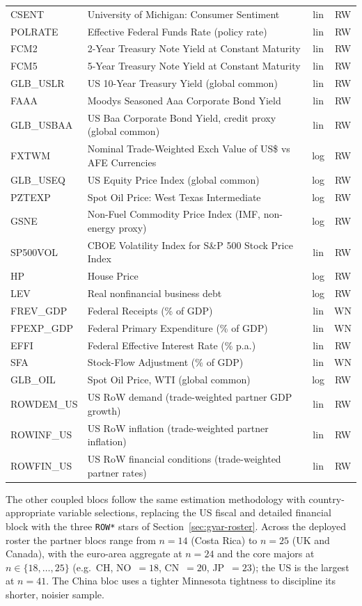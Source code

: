\documentclass[11pt]{article}
\theoremstyle{definition}
\theoremstyle{remark}
\begin{document}
\begin{longtable}{lp{6.5cm}cc}
CSENT     & University of Michigan: Consumer Sentiment & lin & RW \\
POLRATE   & Effective Federal Funds Rate (policy rate) & lin & RW \\
FCM2      & 2-Year Treasury Note Yield at Constant Maturity & lin & RW \\
FCM5      & 5-Year Treasury Note Yield at Constant Maturity & lin & RW \\
GLB\_USLR & US 10-Year Treasury Yield (global common) & lin & RW \\
FAAA      & Moodys Seasoned Aaa Corporate Bond Yield & lin & RW \\
GLB\_USBAA& US Baa Corporate Bond Yield, credit proxy (global common) & lin & RW \\
FXTWM     & Nominal Trade-Weighted Exch Value of US\$ vs AFE Currencies & log & RW \\
GLB\_USEQ & US Equity Price Index (global common) & log & RW \\
PZTEXP    & Spot Oil Price: West Texas Intermediate & log & RW \\
GSNE      & Non-Fuel Commodity Price Index (IMF, non-energy proxy) & log & RW \\
SP500VOL  & CBOE Volatility Index for S\&P 500 Stock Price Index & lin & RW \\
HP        & House Price & log & RW \\
LEV       & Real nonfinancial business debt & log & RW \\
FREV\_GDP & Federal Receipts (\% of GDP) & lin & WN \\
FPEXP\_GDP& Federal Primary Expenditure (\% of GDP) & lin & WN \\
EFFI      & Federal Effective Interest Rate (\% p.a.) & lin & RW \\
SFA       & Stock-Flow Adjustment (\% of GDP) & lin & WN \\
GLB\_OIL  & Spot Oil Price, WTI (global common) & log & RW \\
ROWDEM\_US& US RoW demand (trade-weighted partner GDP growth) & lin & RW \\
ROWINF\_US& US RoW inflation (trade-weighted partner inflation) & lin & RW \\
ROWFIN\_US& US RoW financial conditions (trade-weighted partner rates) & lin & RW \\
\end{longtable}

The other coupled blocs follow the same estimation methodology with
country-appropriate variable selections, replacing the US fiscal and
detailed financial block with the three \texttt{ROW*} stars of
Section~\ref{sec:gvar-roster}. Across the deployed roster the partner
blocs range from $n=14$ (Costa Rica) to $n=25$ (UK and Canada), with the
euro-area aggregate at $n=24$ and the core majors at $n\in\{18,\dots,25\}$
(e.g.\ CH, NO~$=18$, CN~$=20$, JP~$=23$); the US is the largest at $n=41$.
The China bloc uses a tighter Minnesota tightness to discipline its
shorter, noisier sample.
\end{document}
